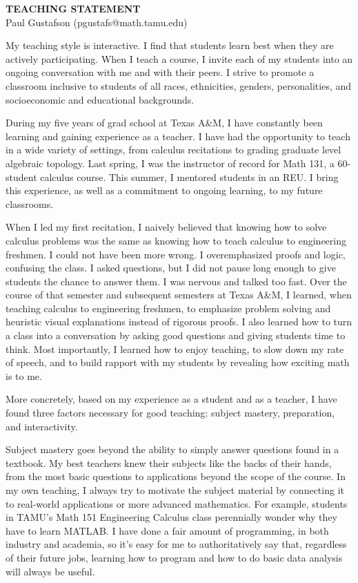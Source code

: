 \documentclass[12pt]{article}
\theoremstyle{plain} \numberwithin{equation}{section}
\theoremstyle{definition}
\begin{document}
\begin{center}
{\bf TEACHING STATEMENT}\\
\vspace*{0.1cm}
{\normalsize Paul Gustafson (pgustafs@math.tamu.edu)}
\end{center}


My teaching style is interactive.  I find that students learn best when they are actively participating.  When I teach a course, I invite each of my students into an ongoing conversation with me and with their peers.  I strive to promote a classroom inclusive to students of all races, ethnicities, genders, personalities, and socioeconomic and educational backgrounds.

During my five years of grad school at Texas A\&M, I have constantly been learning and gaining experience as a teacher.   I have had the opportunity to teach in a wide variety of settings, from calculus recitations to grading graduate level algebraic topology.  Last spring, I was the instructor of record for Math 131, a 60-student calculus course.  This summer, I mentored  students in an REU.  I bring this experience, as well as a commitment to ongoing learning, to my future classrooms.

When I led my first recitation, I naively believed that knowing how to solve calculus problems was the same as knowing how to teach calculus to engineering freshmen.  I could not have been more wrong.  I overemphasized proofs and logic, confusing the class.  I asked questions, but I did not pause long enough to give students the chance to answer them.  I was nervous and talked too fast.  Over the course of that semester and subsequent semesters at Texas A\&M,  I learned, when teaching calculus to engineering freshmen, to emphasize problem solving and heuristic visual explanations instead of rigorous proofs.  I also learned how to turn a class into a conversation by asking good questions and giving students time to think.  Most importantly, I learned how to enjoy teaching, to slow down my rate of speech, and to build rapport with my students by revealing how exciting math is to me.

More concretely, based on my experience as a student and as a teacher, I have found three factors necessary for good teaching: subject mastery, preparation, and interactivity.   

Subject mastery goes beyond the ability to simply answer questions found in a textbook. My best teachers knew their subjects like the backs of their hands, from the most basic questions to applications beyond the scope of the course.  In my own teaching, I always try to motivate the subject material by connecting it to real-world applications or more advanced mathematics.  For example, students in TAMU’s Math 151 Engineering Calculus class perennially wonder why they have to learn MATLAB.  I have done a fair amount of programming, in both industry and academia, so it’s easy for me to authoritatively say that, regardless of their future jobs, learning how to program and how to do basic data analysis will always be useful. 
\end{document}
